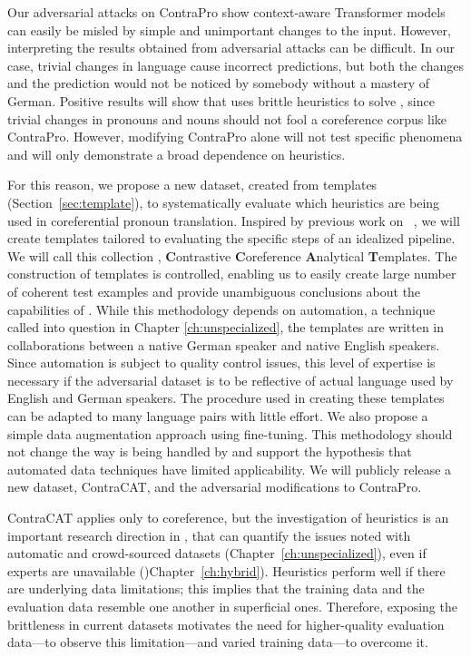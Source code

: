 Our adversarial attacks on ContraPro show context-aware Transformer \nmt{} models can easily be misled by simple and unimportant changes to the input.
%
However, interpreting the results obtained from adversarial attacks can be difficult. 
%
In our case, trivial changes in language cause incorrect predictions, but both the changes and the prediction would not be noticed by somebody without a mastery of German.  
%
Positive results will show that \nmt{} uses brittle heuristics to solve \coref{}, since trivial changes in pronouns and nouns should not fool a coreference corpus like ContraPro.
%
However, modifying ContraPro alone will not test specific phenomena and will only demonstrate a broad dependence on heuristics.  

For this reason, we propose a new dataset, created from templates (Section~\ref{sec:template}), to systematically evaluate which heuristics are being used in coreferential pronoun translation.  
%
Inspired by previous work on \coref{}~\citep{raghunathan2010multi,lee2011stanford}, we will create templates tailored to evaluating the specific steps of an idealized \coref{} pipeline. 
%
We will call this collection \contracat{}, \textbf{C}ontrastive \textbf{C}oreference \textbf{A}nalytical \textbf{T}emplates. 
%
The construction of templates is controlled, enabling us to easily create large number of coherent test examples and provide unambiguous conclusions about the \coref{} capabilities of \nmt{}. 
%
While this methodology depends on automation, a technique called into question in Chapter \ref{ch:unspecialized}, the templates are written in collaborations between a native German speaker and native English speakers. 
%
Since automation is subject to quality control issues, this level of expertise is necessary if the adversarial dataset is to be reflective of actual language used by English and German speakers.
%
The procedure used in creating these templates can be adapted to many language pairs with little effort.
%
We also propose a simple data augmentation approach using fine-tuning. 
%
This methodology should not change the way \coref{} is being handled by \nmt{} and support the hypothesis that automated data techniques have limited applicability.  
%
We will publicly release a new dataset, ContraCAT, and the adversarial modifications to ContraPro.

ContraCAT applies only to coreference, but the investigation of heuristics is an important research direction in \nlp{}, that can quantify the issues noted with automatic and crowd-sourced datasets (Chapter~\ref{ch:unspecialized}), even if experts are unavailable ()Chapter~\ref{ch:hybrid}).
%
Heuristics perform well if there are underlying data limitations; this implies that the training data and the evaluation data resemble one another in superficial ones.
%
Therefore, exposing the brittleness in current datasets motivates the need for higher-quality evaluation data---to observe this limitation---and varied training data---to overcome it.  

